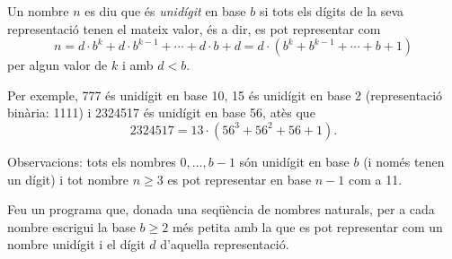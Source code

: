 
\Statement

Un nombre $n$ es diu que és \emph{unidígit} en base $b$ si tots els dígits de la seva representació tenen el mateix valor, és a dir, es pot representar com
\[ n = d\cdot b^k + d\cdot b^{k-1} + \cdots + d\cdot b + d = d \cdot (b^k + b^{k-1} + \cdots + b + 1)\]
per algun valor de $k$ i amb $d < b$.

\medskip

Per exemple, 777 és unidígit en base 10, 15 és unidígit en base 2 (representació binària: 1111) i 2324517 és unidígit en base 56, atès que
\[ 2324517 = 13 \cdot (56^3 + 56^2 + 56 + 1).\]

\medskip

Observacions: tots els nombres $0,\ldots,b-1$ són unidígit en base $b$ (i només tenen un dígit) i tot nombre $n\geq 3$ es pot representar en base $n-1$ com a 11.

\medskip

Feu un programa que, donada una seqüència de nombres naturals, per a cada nombre escrigui la base $b\geq 2$ més petita amb la que es pot representar com un nombre unidígit i el dígit $d$ d'aquella representació.

\SampleTwoCol